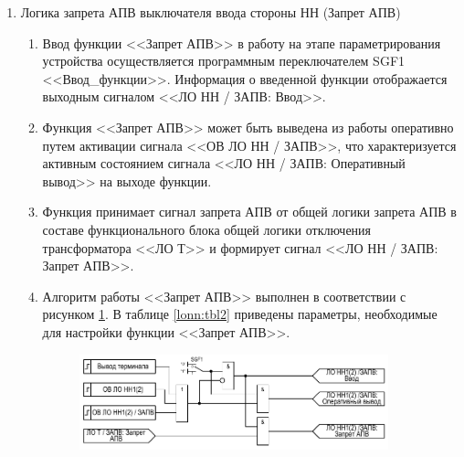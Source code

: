 \documentclass[a4paper, 12pt,table, hidelinks, DIV=calc]{extarticle} %
\begin{document}
\begin{enumerate}[label=\arabic{section}.\arabic{subsection}.\arabic{enumi}, labelsep=4pt, leftmargin=0pt, itemindent=57pt, itemsep=0pt, parsep=5pt]
\item Логика запрета АПВ выключателя ввода стороны НН (Запрет АПВ)

\begin{enumerate}[label=\arabic{section}.\arabic{subsection}.\arabic{enumi}.\arabic*, labelsep=4pt, leftmargin=0em, itemindent=65pt, parsep=0pt]

\item
Ввод функции <<Запрет АПВ>> в работу на этапе параметрирования устройства осуществляется программным переключателем SGF1 <<Ввод\_функции>>. Информация о введенной функции отображается выходным сигналом <<ЛО НН / ЗАПВ: Ввод>>.
\item
Функция <<Запрет АПВ>> может быть выведена из работы оперативно путем активации сигнала <<ОВ ЛО НН / ЗАПВ>>, что характеризуется активным состоянием сигнала <<ЛО НН / ЗАПВ: Оперативный вывод>> на выходе функции.
\item
Функция принимает сигнал запрета АПВ от общей логики запрета АПВ в составе функционального блока общей логики отключения трансформатора <<ЛО Т>> и формирует сигнал <<ЛО НН / ЗАПВ: Запрет АПВ>>.
\item
Алгоритм работы <<Запрет АПВ>> выполнен в соответствии с рисунком \ref{lonn:img2}. В таблице \ref{lonn:tbl2} приведены параметры, необходимые для настройки функции <<Запрет АПВ>>.

\begin{figure}[!h]
\centering
\includegraphics[width=0.9\textwidth,height=0.9\textheight,keepaspectratio]{img35.pdf}
\label{lonn:img2}
\end{figure}


\end{enumerate}
\end{enumerate}
\end{document}

